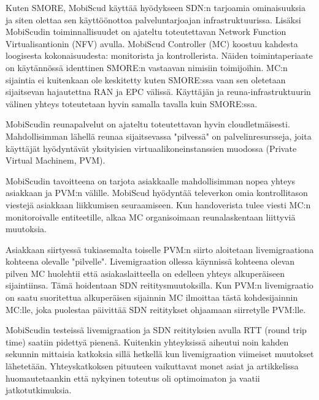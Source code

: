 \documentclass[finnish]{tktltiki2}
\theoremstyle{definition}
\theoremstyle{remark}
\begin{document}
Kuten SMORE, MobiScud käyttää hyödykseen SDN:n tarjoamia ominaisuuksia ja siten olettaa sen käyttöönottoa palveluntarjoajan infrastruktuurissa. Lisäksi MobiScudin toiminnallisuudet on ajateltu toteutettavan Network Function Virtualisantionin (NFV) avulla. 
MobiScud Controller (MC) koostuu kahdesta loogisesta kokonaisuudesta: monitorista ja kontrollerista. Näiden toimintaperiaate on käytännössä identtinen SMORE:n vastaavan nimisiin toimijoihin. MC:n sijaintia ei kuitenkaan ole keskitetty kuten SMORE:ssa vaan sen oletetaan sijaitsevan hajautettna RAN ja EPC välissä.
Käyttäjän ja reuna-infrastruktuurin välinen yhteys toteutetaan hyvin samalla tavalla kuin SMORE:ssa. 

MobiScudin reunapalvelut on ajateltu toteutettavan hyvin cloudletmäisesti. Mahdollisimman lähellä reunaa sijaitsevassa "pilvessä" on palvelinresursseja, joita käyttäjät hyödyntävät yksityisien virtuaalikoneinstanssien muodossa (Private Virtual Machinem, PVM). 

MobiScudin tavoitteena on tarjota asiakkaalle mahdollisimman nopea yhteys asiakkaan ja PVM:n välille. MobiScud hyödyntää televerkon omia kontrollitason viestejä asiakkaan liikkumisen seuraamiseen. Kun handoverista tulee viesti MC:n monitoroivalle entiteetille, alkaa MC organisoimaan reunalaskentaan liittyviä muutoksia. 

Asiakkaan siirtyessä tukiasemalta toiselle PVM:n siirto aloitetaan livemigraationa kohteena olevalle "pilvelle". Livemigraation ollessa käynnissä kohteena olevan pilven MC huolehtii että asiakaslaitteella on edelleen yhteys alkuperäiseen sijaintiinsa. Tämä hoidentaan SDN reititysmuutoksilla. Kun PVM:n livemigraatio on saatu suoritettua alkuperäisen sijainnin MC ilmoittaa tästä kohdesijainnin MC:lle, joka puolestaa päivittää SDN reititykset ohjaamaan siirretylle PVM:lle.

MobiScudin testeissä livemigraation ja SDN reitityksien avulla RTT (round trip time) saatiin pidettyä pienenä. Kuitenkin yhteyksissä aiheutui noin kahden sekunnin mittaisia katkoksia sillä hetkellä kun livemigraation viimeiset muutokset lähetetään. Yhteyskatkoksen pituuteen vaikuttavat monet asiat ja artikkelissa huomautetaankin että nykyinen toteutus oli optimoimaton ja vaatii jatkotutkimuksia.
\end{document}
